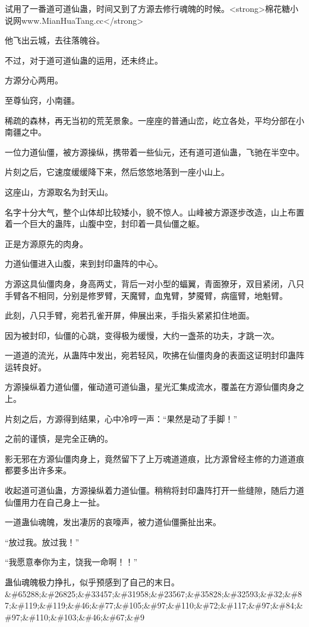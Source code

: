 
\begin{this_body}

试用了一番道可道仙蛊，时间又到了方源去修行魂魄的时候。<strong>棉花糖小说网www.MianHuaTang.cc</strong>

他飞出云城，去往落魄谷。

不过，对于道可道仙蛊的运用，还未终止。

方源分心两用。

至尊仙窍，小南疆。

稀疏的森林，再无当初的荒芜景象。一座座的普通山峦，屹立各处，平均分部在小南疆之中。

一位力道仙僵，被方源操纵，携带着一些仙元，还有道可道仙蛊，飞驰在半空中。

片刻之后，它速度缓缓降下来，然后悠悠地落到一座小山上。

这座山，方源取名为封天山。

名字十分大气，整个山体却比较矮小，貌不惊人。山峰被方源逐步改造，山上布置着一个巨大的蛊阵，山腹中空，封印着一具仙僵之躯。

正是方源原先的肉身。

力道仙僵进入山腹，来到封印蛊阵的中心。

方源这具仙僵肉身，身高两丈，背后一对小型的蝠翼，青面獠牙，双目紧闭，八只手臂各不相同，分别是修罗臂，天魔臂，血鬼臂，梦魇臂，病瘟臂，地魁臂。

此刻，八只手臂，宛若孔雀开屏，伸展出来，手指头紧紧扣住地面。

因为被封印，仙僵的心跳，变得极为缓慢，大约一盏茶的功夫，才跳一次。

一道道的流光，从蛊阵中发出，宛若轻风，吹拂在仙僵肉身的表面这证明封印蛊阵运转良好。

方源操纵着力道仙僵，催动道可道仙蛊，星光汇集成流水，覆盖在方源仙僵肉身之上。

片刻之后，方源得到结果，心中冷哼一声：“果然是动了手脚！”

之前的谨慎，是完全正确的。

影无邪在方源仙僵肉身上，竟然留下了上万魂道道痕，比方源曾经主修的力道道痕都要多出许多来。

收起道可道仙蛊，方源操纵着力道仙僵。稍稍将封印蛊阵打开一些缝隙，随后力道仙僵用力在自己身上一扯。

一道蛊仙魂魄，发出凄厉的哀嚎声，被力道仙僵撕扯出来。

“放过我。放过我！”

“我愿意奉你为主，饶我一命啊！！”

蛊仙魂魄极力挣扎，似乎预感到了自己的末日。\&\#65288;\&\#26825;\&\#33457;\&\#31958;\&\#23567;\&\#35828;\&\#32593;\&\#32;\&\#87;\&\#119;\&\#119;\&\#46;\&\#77;\&\#105;\&\#97;\&\#110;\&\#72;\&\#117;\&\#97;\&\#84;\&\#97;\&\#110;\&\#103;\&\#46;\&\#67;\&\#9


\end{this_body}
